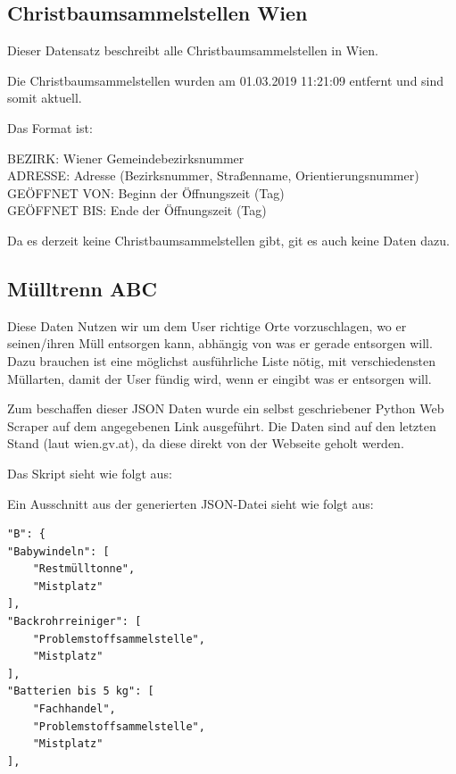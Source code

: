 \documentclass[12pt, a4paper]{scrreprt}
\begin{document}
\subsection{Christbaumsammelstellen Wien \cite{christbaumsammelstellen}}
    Dieser Datensatz beschreibt alle Christbaumsammelstellen in Wien.

    Die Christbaumsammelstellen wurden am 01.03.2019 11:21:09 entfernt und sind somit aktuell.

    Das Format ist:
    \begin{tcolorbox}
        BEZIRK: Wiener Gemeindebezirksnummer\\
        ADRESSE: Adresse (Bezirksnummer, Straßenname, Orientierungsnummer)\\
        GEÖFFNET VON: Beginn der Öffnungszeit (Tag)\\
        GEÖFFNET BIS: Ende der Öffnungszeit (Tag) 
    \end{tcolorbox}
    
    Da es derzeit keine Christbaumsammelstellen gibt, git es auch keine Daten dazu.
\subsection{Mülltrenn ABC \cite{muelltrennabc}}
Diese Daten Nutzen wir um dem User richtige Orte vorzuschlagen, wo er seinen/ihren Müll entsorgen kann, abhängig von was er gerade entsorgen will. Dazu brauchen ist eine möglichst ausführliche Liste nötig, mit verschiedensten Müllarten, damit der User fündig wird, wenn er eingibt was er entsorgen will.

Zum beschaffen dieser JSON Daten wurde ein selbst geschriebener Python Web Scraper auf dem angegebenen Link ausgeführt. Die Daten sind auf den letzten Stand (laut wien.gv.at), da diese direkt von der Webseite geholt werden.

Das Skript sieht wie folgt aus:



Ein Ausschnitt aus der generierten JSON-Datei sieht wie folgt aus:

\begin{lstlisting}
"B": {
"Babywindeln": [
    "Restmülltonne",
    "Mistplatz"
],
"Backrohrreiniger": [
    "Problemstoffsammelstelle",
    "Mistplatz"
],
"Batterien bis 5 kg": [
    "Fachhandel",
    "Problemstoffsammelstelle",
    "Mistplatz"
], 
\end{lstlisting}
\end{document}
